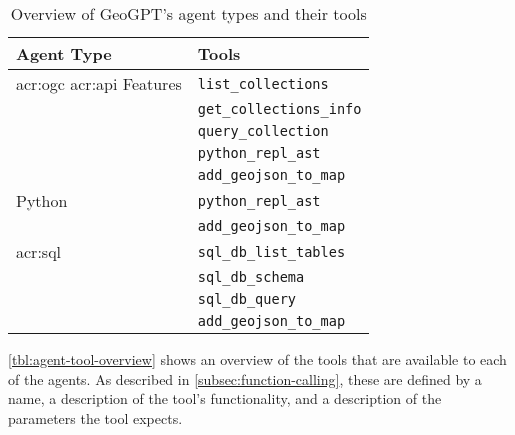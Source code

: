 \begin{table}[h]
    \centering
    \caption{Overview of GeoGPT's agent types and their tools}
    \label{tbl:agent-tool-overview}
    \begin{tabularx}{0.7\textwidth}{XX}
        \toprule
        \textbf{Agent Type}                            & \textbf{Tools}                  \\
        \midrule
        \acrshort{acr:ogc} \acrshort{acr:api} Features & \texttt{list\_collections}      \\
                                                       & \texttt{get\_collections\_info} \\
                                                       & \texttt{query\_collection}      \\
                                                       & \texttt{python\_repl\_ast}      \\
                                                       & \texttt{add\_geojson\_to\_map}  \\
        \midrule
        Python                                         & \texttt{python\_repl\_ast}      \\
                                                       & \texttt{add\_geojson\_to\_map}  \\
        \midrule
        \acrshort{acr:sql}                             & \texttt{sql\_db\_list\_tables}  \\
                                                       & \texttt{sql\_db\_schema}        \\
                                                       & \texttt{sql\_db\_query}         \\
                                                       & \texttt{add\_geojson\_to\_map}  \\
        \bottomrule
    \end{tabularx}
\end{table}

\autoref{tbl:agent-tool-overview} shows an overview of the tools that are available to each of the agents. As described in \autoref{subsec:function-calling}, these are defined by a name, a description of the tool's functionality, and a description of the parameters the tool expects.

